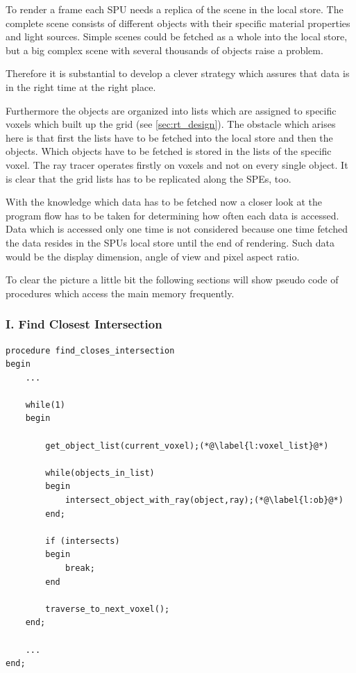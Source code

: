 \documentclass[DIV10, abstracton, openright, footsepline, headsepline, twoside, 9pt,
bigheadings]{scrreprt}
\begin{document}
To render a frame each SPU needs a replica of the scene in the local store.
The complete scene consists of different objects with their specific material
properties and light sources. Simple scenes could be fetched as a whole into the
local store, but a big complex scene with several thousands of objects raise a problem.

Therefore it is substantial to develop a clever strategy which assures that data
is in the right time at the right place.

Furthermore the objects are organized into lists which are assigned to specific
voxels which built up the grid (see \ref{sec:rt_design}). The obstacle which arises
here is that first the lists have to be fetched into the local store and then the
objects. Which objects have to be fetched is stored in the lists of the specific voxel.
The ray tracer operates firstly on voxels and not on every single object. It is clear
that the grid lists has to be replicated along the SPEs, too.

With the knowledge which data has to be fetched now a closer look at the
program flow has to be taken for determining how often each data is accessed.
Data which is accessed only one time is not considered because one time fetched
the data resides in the SPUs local store until the end of rendering. Such data would
be the display dimension, angle of view and pixel aspect ratio.

To clear the picture a little bit the following sections will show pseudo code
of procedures which access the main memory frequently.

\subsubsection*{I. Find Closest Intersection }
\begin{lstlisting}[caption=Pseudo code for "find closest intersection"
function]
procedure find_closes_intersection
begin
	...

	while(1)
	begin

		get_object_list(current_voxel);(*@\label{l:voxel_list}@*)

		while(objects_in_list)
		begin
			intersect_object_with_ray(object,ray);(*@\label{l:ob}@*)
		end;

		if (intersects)
		begin
			break;
		end

		traverse_to_next_voxel();
	end;

	...
end;
\end{lstlisting}
\end{document}
